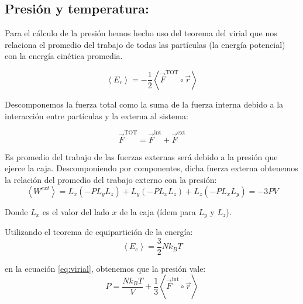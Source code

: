 
% 

\subsection{Presión y temperatura:}
Para el cálculo de la presión hemos hecho uso del teorema del virial que nos relaciona el promedio del trabajo de todas las partículas (la energía potencial) con la energía cinética promedia.

\begin{equation}
\left\langle E_c \right\rangle= -\frac{1}{2} \left\langle \vec{F}^{\text{TOT}} \circ \vec{r} \right\rangle
\label{eq:virial}
\end{equation}

Descomponemos la fuerza total como la suma de la fuerza interna debido a la interacción entre partículas y la externa al sistema:

\begin{equation}
\vec{F}^{\text{TOT}} = \vec{F}^{\text{int}}+\vec{F}^{\text{ext}}
\end{equation}

Es promedio del trabajo de las fuerzas externas será debido a la presión que ejerce la caja. Descomponiendo por componentes, dicha fuerza externa obtenemos la relación del promedio del trabajo externo con la presión:
\begin{equation}
\left\langle W^{ext}	\right\rangle = L_x (-PL_yL_z)+L_y (-PL_xL_z)+L_z (-PL_xL_y)= -3PV
\end{equation}

Donde $L_x$ es el valor del lado $x$ de la caja (ídem para $L_y$ y $L_z$).

Utilizando el teorema de equipartición de la energía:
\begin{equation}
\left\langle E_c \right\rangle= \frac{3}{2} N k_B T
\label{eq:particion}
\end{equation}

en la ecuación \ref{eq:virial}, obtenemos que la presión vale:
\begin{equation}
P = \frac{Nk_BT}{V}+\frac{1}{3}\left\langle \vec{F}^{\text{int}} \circ \vec{r} \right\rangle
\label{eq:presion}
\end{equation}


